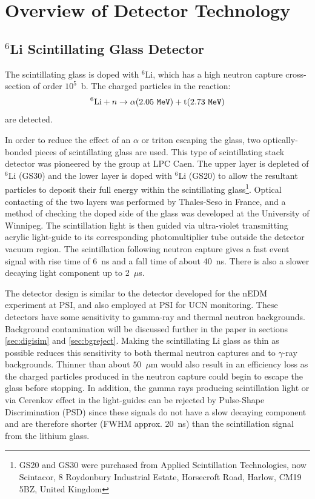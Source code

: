 \documentclass[letter,twocolumn,preprint,3p,numbers,sort&compress]{elsarticle}
\begin{document}
\section{Overview of Detector Technology}\label{sec:overview}


\subsection{$^6$Li Scintillating Glass Detector}

The scintillating glass is doped with $^6$Li, which has a high neutron
capture cross-section of order $10^5$~b.  The charged particles in the
reaction:
\begin{equation}
^6{\rm Li} + n \rightarrow \alpha (2.05\ {\tt MeV}) + {\rm t} (2.73\ {\tt MeV})
\end{equation}
are detected. 

In order to reduce the effect of an $\alpha$ or triton escaping the
glass, two optically-bonded pieces of scintillating glass are used.
This type of scintillating stack detector was pioneered by the group
at LPC Caen\cite{ban, ban05, afach, gban2016}. The upper layer is depleted of
$^6$Li (GS30) and the lower layer is doped with $^6$Li (GS20) to allow
the resultant particles to deposit their full energy within the
scintillating glass\footnote{GS20 and GS30 were purchased from Applied
  Scintillation Technologies, now Scintacor, 8 Roydonbury Industrial
  Estate, Horsecroft Road, Harlow, CM19 5BZ, United Kingdom}.  Optical
contacting of the two layers was performed by Thales-Seso in France,
and a method of checking the doped side of the glass was developed at
the University of Winnipeg\cite{jamieson}.  The scintillation light is
then guided via ultra-violet transmitting acrylic light-guide to its
corresponding photomultiplier tube outside the detector vacuum region.
The scintillation following neutron capture gives a fast event signal
with rise time of 6~ns and a fall time of about 40~ns.  There is also
a slower decaying light component up to 2~$\mu$s.

The detector design is similar to the detector developed for the nEDM
experiment at PSI, and also employed at PSI for UCN
monitoring\cite{LGoeltl}.  These detectors have some sensitivity to
gamma-ray and thermal neutron backgrounds.  Background contamination
will be discussed further in the paper in sections \ref{sec:digisim}
and \ref{sec:bgreject}.  Making the scintillating Li glass as thin as possible
reduces this sensitivity to both thermal neutron captures and to
$\gamma$-ray backgrounds.  Thinner than about $50$~$\mu$m would also
result in an efficiency loss as the charged particles produced in the
neutron capture could begin to escape the glass before stopping.  In
addition, the gamma rays producing scintillation light or via Cerenkov
effect in the light-guides can be rejected by Pulse-Shape
Discrimination (PSD) since these signals do not have a slow decaying
component and are therefore shorter (FWHM approx. 20~ns) than the
scintillation signal from the lithium glass.
\end{document}
